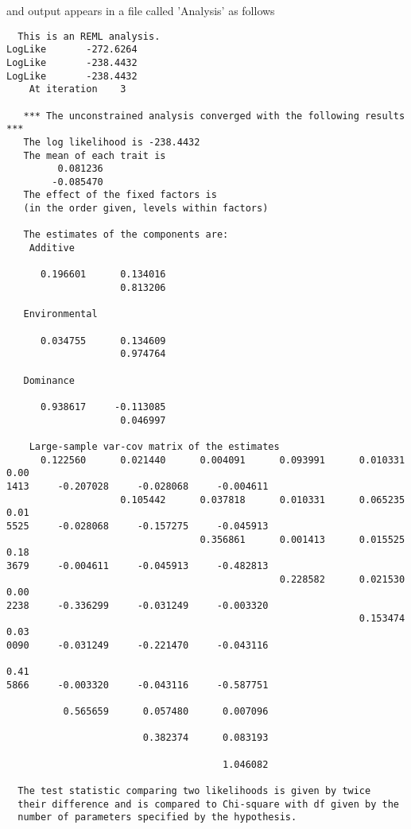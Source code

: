 \documentclass[titlepage]{article}  %
\begin{document}
and output appears in a file called 'Analysis' as follows

\begin{verbatim}
  This is an REML analysis.
LogLike       -272.6264
LogLike       -238.4432
LogLike       -238.4432
    At iteration    3

   *** The unconstrained analysis converged with the following results ***
   The log likelihood is -238.4432
   The mean of each trait is
         0.081236
        -0.085470
   The effect of the fixed factors is
   (in the order given, levels within factors)

   The estimates of the components are:
    Additive
              
      0.196601      0.134016
                    0.813206
                            
   Environmental
              
      0.034755      0.134609
                    0.974764
                            
   Dominance
              
      0.938617     -0.113085
                    0.046997
                            
    Large-sample var-cov matrix of the estimates
      0.122560      0.021440      0.004091      0.093991      0.010331      0.00
1413     -0.207028     -0.028068     -0.004611
                    0.105442      0.037818      0.010331      0.065235      0.01
5525     -0.028068     -0.157275     -0.045913
                                  0.356861      0.001413      0.015525      0.18
3679     -0.004611     -0.045913     -0.482813
                                                0.228582      0.021530      0.00
2238     -0.336299     -0.031249     -0.003320
                                                              0.153474      0.03
0090     -0.031249     -0.221470     -0.043116
                                                                            0.41
5866     -0.003320     -0.043116     -0.587751
                                                                                
          0.565659      0.057480      0.007096
                                                                                
                        0.382374      0.083193
                                                                                
                                      1.046082
                                              
  The test statistic comparing two likelihoods is given by twice
  their difference and is compared to Chi-square with df given by the 
  number of parameters specified by the hypothesis.
\end{verbatim}
\end{document}
